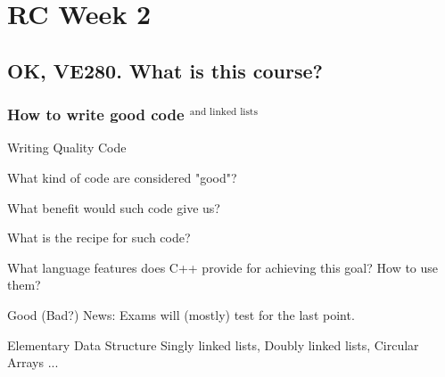 	\section{RC Week 2}
		\subsection{OK, VE280. What is this course?}
		\begin{frame}
	\frametitle{How to write good code ${}^\text{and linked lists}$}	
	\begin{block}{Writing Quality Code}
		\begin{description}[Motivation]
					\item[Taste] What kind of code are considered "good"?
					\item[Motivation] What benefit would such code give us?
					\item[Techique] What is the recipe for such code?
					\item[Tools] What language features does C++ provide for achieving this goal? How to use them?
				\end{description}
				\small{Good (Bad?) News: Exams will (mostly) test for the last point.}
			\end{block}
			\begin{block}{Elementary Data Structure}
				Singly linked lists, Doubly linked lists, Circular Arrays ... \
			\end{block}
		\end{frame}
